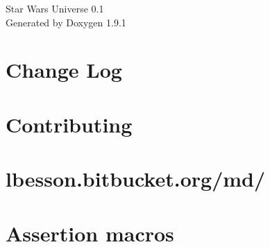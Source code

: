 \let\mypdfximage\pdfximage\def\pdfximage{\immediate\mypdfximage}\documentclass[twoside]{book}
\newcommand{\+}{\discretionary{\mbox{\scriptsize$\hookleftarrow$}}{}{}}
\newcommand{\clearemptydoublepage}{%
  \newpage{\pagestyle{empty}\cleardoublepage}%
}
\begin{document}
\raggedbottom

\hypersetup{pageanchor=false,
             bookmarksnumbered=true,
             pdfencoding=unicode
            }
\begin{titlepage}
\vspace*{7cm}
\begin{center}%
{\Large Star Wars Universe 0.1 }\\
\vspace*{1cm}
{\large Generated by Doxygen 1.9.1}\\
\end{center}
\end{titlepage}
\clearemptydoublepage
{}
\tableofcontents
\clearemptydoublepage
{}
\hypersetup{pageanchor=true}

\chapter{Change Log}
\label{md__c___users__u_s_e_r_source_repos_bzareva_star_wars_universe_0_1_doctest__c_h_a_n_g_e_l_o_g}

\chapter{Contributing}
\label{md__c___users__u_s_e_r_source_repos_bzareva_star_wars_universe_0_1_doctest__c_o_n_t_r_i_b_u_t_i_n_g}

\chapter{lbesson.\+bitbucket.\+org/md/}
\label{md__c___users__u_s_e_r_source_repos_bzareva_star_wars_universe_0_1_doctest_doc_html_generated_strapdown_js__r_e_a_d_m_e}

\chapter{Assertion macros}
\label{md__c___users__u_s_e_r_source_repos_bzareva_star_wars_universe_0_1_doctest_doc_markdown_assertions}

\end{document}
